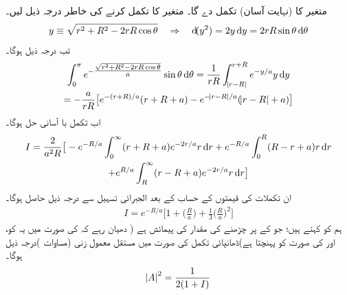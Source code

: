  متغیر  کا (نہایت آسان) تکمل  دے گا۔ متغیر  کا تکمل کرنے کی خاطر درجہ ذیل لیں۔
\begin{align*}
y\equiv\sqrt{r^{2}+R^{2}-2rR\cos{\theta}}\quad \Rightarrow \quad \dif (y^{2})=2y\dif y=2rR\sin{\theta}\dif \theta
\end{align*}
 تب درجہ ذیل ہوگا۔
\begin{multline*}
\int_{0}^{\pi}e^{-\tfrac{\sqrt{r^{2}+R^{2}-2rR\cos{\theta}}}{a}}\sin{\theta}\dif \theta=\frac{1}{rR}\int_{\abs{r-R}}^{r+R}e^{-y/a}y\dif y\\
=-\frac{a}{rR}\big[e^{-(r+R)/a}(r+R+a)-e^{-\abs{r-R}/a}(\abs{r-R}+a)\big]
\end{multline*}
 اب تکمل  با آسانی حل ہوگا۔ 
\begin{multline*}
I=\frac{2}{a^{2}R}\big[-e^{-R/a}\int_{0}^{\infty}(r+R+a)e^{-2r/a}r\dif r+e^{-R/a}\int_{0}^{R}(R-r+a)r\dif r\\
+e^{R/a}\int_{R}^{\infty}(r-R+a)e^{-2r/a}r\dif r\big]
\end{multline*}
 ان تکملات کی قیمتوں کے حساب کے بعد الجبرائی تسہیل سے درجہ ذیل حاصل ہوگا۔
\begin{align}
I=e^{-R/a}\big[1+\big(\frac{R}{a}\big)+\frac{1}{3}\big(\frac{R}{a}\big)^{2}\big]
\end{align}
ہم  کو  کہتے ہیں؛ جو  کے  پر چڑھنے کی مقدار کی پیمائش ہے ( دھیان رہے کہ  کی صورت میں یہ  کو، اور  کی صورت  کو پہنچتا ہے)ڈھانپائی تکمل  کی صورت میں مستقل معمول زنی (مساوات )درجہ ذیل ہوگا۔
\begin{align}
\abs{A}^{2}=\frac{1}{2(1+I)} 
\end{align}

